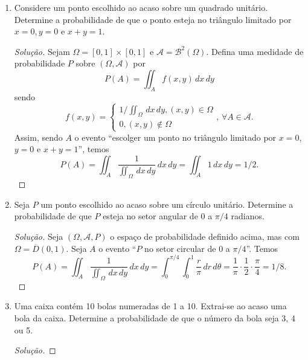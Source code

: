 \documentclass[../Notas.tex]{subfiles}
\begin{document}
\begin{enumerate}
\begin{proof}[Solução]
        \[
        P\left( \bigcup_{i \text{ par}} Z_i \right) 
        = \sum_{i \text{ par}} P(Z_i) 
        = 13\cdot\frac{2\pi/37}{2\pi}
        = 13/37,
        \]
        já que $Z_i\cap Z_j = \varnothing$ para $i\neq j$.
    \end{proof}
    \item Considere um ponto escolhido ao acaso sobre um quadrado unitário. Determine a probabilidade de que o ponto esteja no triângulo limitado por $x=0, y=0$ e $x+y=1$.
    \begin{proof}[Solução]
        Sejam $\Omega = [0,1]\times[0,1]$ e $\mathcal{A} = \mathcal{B}^2(\Omega)$. Defina uma medidade de
        probabilidade $P$ sobre $(\Omega, \mathcal{A})$ por
        \[
        P(A) = \iint_A f(x,y) \, dx \,dy
        \]
        sendo
        \[
        f(x,y) = \begin{cases}
        1/\iint_{\Omega} \, dx \, dy, (x,y)\in\Omega \\
        0, (x,y) \notin\Omega
        \end{cases}, \, \forall A\in\mathcal{A}.
        \]
        Assim, sendo $A$ o evento ``escolger um ponto no triângulo limitado por $x=0$, $y=0$ e $x+y=1$'',
        temos
        \[
        P(A) = \iint_A \frac{1}{\iint_{\Omega} \, dx \, dy} \, dx \, dy
             = \iint_A 1 \, dx \, dy
             = 1/2.
        \]
    \end{proof}
    \item Seja $P$ um ponto escolhido ao acaso sobre um círculo unitário. Determine a probabilidade de que $P$ esteja no setor angular de 0 a $\pi/4$ radianos.
    \begin{proof}[Solução]
        Seja $(\Omega, \mathcal{A}, P)$ o espaço de probabilidade definido acima, mas com 
        $\Omega = \overline{D}(0,1)$. Seja $A$ o evento ``$P$ no setor circular de $0$ a $\pi/4$''.
        Temos
        \[
        P(A) = \iint_A \frac{1}{\iint_{\Omega} \, dx \, dy} \, dx \, dy
             = \int_{0}^{\pi/4}\int_0^1 \frac{r}{\pi} \, dr \, d\theta
             = \frac{1}{\pi}\cdot\frac{1}{2}\cdot\frac{\pi}{4}
             = 1/8.
        \]
    \end{proof}
    \item Uma caixa contém 10 bolas numeradas de 1 a 10. Extrai-se ao acaso uma bola da caixa. Determine a probabilidade de que o número da bola seja 3, 4 ou 5.
    \begin{proof}[Solução]

\end{proof}
\end{enumerate}
\end{document}
